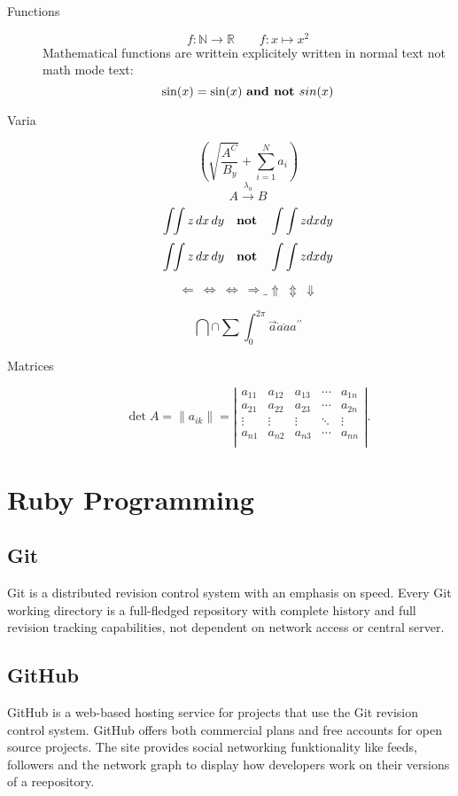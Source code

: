 \documentclass[10pt,a4paper]{scrartcl}
\begin{document}
\begin{description}
\item[Functions]
\[ f : \mathbb{N} \to \mathbb{R} \qquad f : x \mapsto x^2\]
Mathematical functions are writtein explicitely written in normal text not
math mode text:
\[ \sin(x) = \text{sin}(x) \text{ {\bf and not }} sin(x)\]

\item[Varia]
\[ \left( \sqrt{\frac{A^C}{B_y}} +	 \sum_{i=1}^N a_i\right) \]
\[ A \stackrel {\lambda_a} {\longrightarrow} B \]
\[ \int \! \! \int z\,dx \, dy \quad \mbox {\bf not} \quad \int\int z dx dy \]
\[ \int \! \! \int z\,dx \, dy \quad \mbox {\bf not} \quad \int\int z dx dy \]
				
{\Large
\[ \Leftarrow \  \Leftrightarrow \  \Longleftrightarrow \  \Rightarrow \_ 
    \Uparrow \  \Updownarrow \  \Downarrow	\]}
				
\[\bigcap \cap \sum \int_0^{2\pi} \vec{a} \dot{a} \ddot{a} a^{\prime \prime} \]


\item[Matrices]
\[ \det A = \| a_{ik} \| =
\left| \begin{array}{ccccc}
    a_{11} & a_{12} & a_{13} &  \cdots & a_{1n} \\
    a_{21} & a_{22} & a_{23} &  \cdots & a_{2n} \\
    \vdots  & \vdots  & \vdots  & \ddots & \vdots\\
    a_{n1} & a_{n2} & a_{n3} &  \cdots & a_{nn} \\
\end{array} \right| . \]

\end{description}

\section{Ruby Programming}




\newpage
\begin{singlespacing}
\section{Git}
Git is a distributed revision control system with an emphasis on speed. Every Git working directory is a full-fledged repository with complete history and full revision tracking capabilities, not dependent on network access or central server.
\subsection{GitHub}
GitHub is a web-based hosting service for projects that use the Git revision control system. GitHub offers both commercial plans and free accounts for open source projects. The site provides social networking funktionality like feeds, followers and the network graph to display how developers work on their versions of a reepository.
\end{singlespacing}
\end{document}
